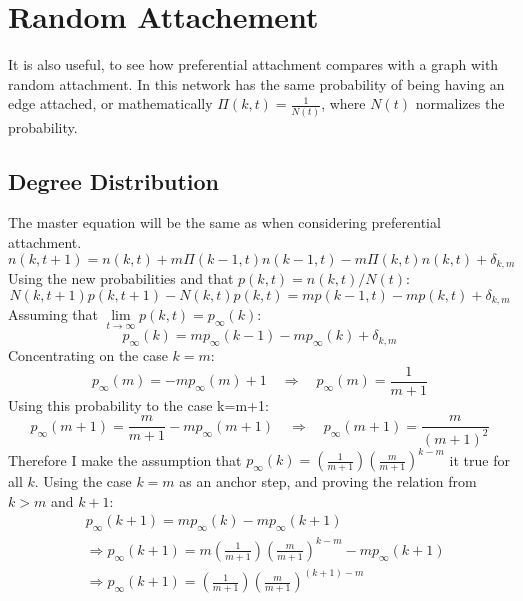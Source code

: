\documentclass[]{article}
\begin{document}
\section{Random Attachement}
It is also useful, to see how preferential attachment compares with a graph with random attachment. In this network has the same probability of being having an edge attached, or mathematically $\Pi(k,t) = \frac{1}{N(t)}$, where $N(t)$ normalizes the probability.
\subsection{Degree Distribution}
The master equation will be the same as when considering preferential attachment. 
\begin{equation}
n(k,t+1)=n(k,t)+m\Pi(k-1,t)n(k-1,t)-m\Pi(k,t)n(k,t)+\delta_{k,m}
\end{equation}
Using the new probabilities and that $p(k,t)=n(k,t)/N(t)$:
\begin{equation}
N(k,t+1)p(k,t+1)-N(k,t)p(k,t)=mp(k-1,t)-mp(k,t)+\delta_{k,m}
\end{equation}
Assuming that $\lim\limits_{t \rightarrow \infty} p(k,t)=p_\infty(k)$:
\begin{equation}
p_{\infty}(k)= mp_{\infty}(k-1)-mp_{\infty}(k) + \delta_{k,m}
\end{equation}
Concentrating on the case $k=m$:
\begin{equation}
p_{\infty}(m)= -mp_{\infty}(m) + 1 \quad
\Rightarrow \quad p_{\infty}(m)= \frac{1}{m+1}
\end{equation}
Using this probability to the case k=m+1:
\begin{equation}
p_{\infty}(m+1)= \frac{m}{m+1}-mp_{\infty}(m+1)
\quad\Rightarrow\quad p_{\infty}(m+1)= \frac{m}{(m+1)^2}
\end{equation}
Therefore I make the assumption that $p_{\infty}(k)= (\frac{1}{m+1})(\frac{m}{m+1})^{k-m}$ it true for all $k$. Using the case $k=m$ as an anchor step, and proving the relation from $k>m$ and $k+1$:
\begin{equation}
\begin{align}
&p_{\infty}(k+1)= mp_{\infty}(k)-mp_{\infty}(k+1)\\
&\Rightarrow p_{\infty}(k+1)= m\left(\frac{1}{m+1}\right)\left(\frac{m}{m+1}\right)^{k-m}-mp_{\infty}(k+1)\\
&\Rightarrow p_{\infty}(k+1)=\left(\frac{1}{m+1}\right)\left(\frac{m}{m+1}\right)^{(k+1)-m}
\end{align}
\end{equation}
\end{document}
